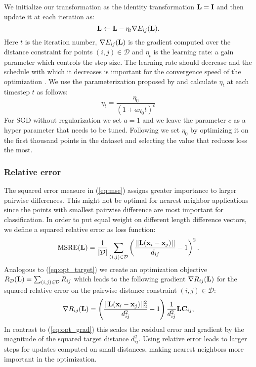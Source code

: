 We initialize our transformation as the identity transformation $\mathbf{L} = \mathbf{I}$ and then update it at each iteration as:
\begin{equation}
\mathbf{L} \leftarrow \mathbf{L} - \eta_{t} \nabla E_{ij}(\mathbf{L}).
\label{eq:update}
\end{equation}
Here $t$ is the iteration number, $\nabla E_{ij}(\mathbf{L})$ is the gradient computed over the distance constraint for points $(i,j) \in \mathcal{D}$ and $\eta_{t}$ is the learning rate: a gain parameter which controls the step size. The learning rate should decrease and the schedule with which it decreases is important for the convergence speed of the optimization \cite{xu2011towards}. We use the parameterization proposed by \cite{xu2011towards} and calculate $\eta_{t}$ at each timestep $t$ as follows:
\begin{equation}
\eta_{t} = \frac{\eta_0}{\left(1+ a \eta_0 t \right)^c}
\label{eq:eta_update}
\end{equation}
For SGD without regularization we set $a = 1$ and we leave the parameter $c$ as a hyper parameter that needs to be tuned. Following \cite{bottou2008tradeoffs} we set $\eta_0$ by optimizing it on the first thousand points in the dataset and selecting the value that reduces loss the most.

\subsubsection{Relative error}

The squared error measure in (\ref{eq:mse}) assigns greater importance to larger pairwise differences. This might not be optimal for nearest neighbor applications since the points with smallest pairwise difference are most important for classification.  In order to put equal weight on different length difference vectors, we define a squared relative error as loss function:
\begin{equation}
\text{MSRE}(\mathbf{L}) = \frac{1}{|\mathcal{D}|}\sum_{(i,j) \in \mathcal{D}} \left ( \frac{||\mathbf{L} (\mathbf{x}_i - \mathbf{x}_j)||}{d_{ij}} - 1 \right)^2.
\label{eq:msre}
\end{equation}
Analogous to (\ref{eq:opt_target}) we create an optimization objective $R_{\mathcal{D}}(\mathbf{L}) = \sum_{(i,j) \in \mathcal{D}} R_{ij}$ which leads to the following gradient $\nabla R_{ij}(\mathbf{L})$ for the squared relative error on the pairwise distance constraint $(i,j) \in \mathcal{D}$:
\begin{equation}
\nabla R_{ij}(\mathbf{L})  =  \left ( \frac{||\mathbf{L}(\mathbf{x}_i - \mathbf{x}_j)||_2^2}{d_{ij}^2} - 1 \right) \frac{1}{d_{ij}^2} \mathbf{L} \mathbf{C}_{ij},
\label{eq:relative_grad}
\end{equation}
In contrast to (\ref{eq:opt_grad}) this scales the residual error and gradient by the magnitude of the squared target distance $d_{ij}^2$. Using relative error leads to larger steps for updates computed on small distances, making nearest neighbors more important in the optimization.


